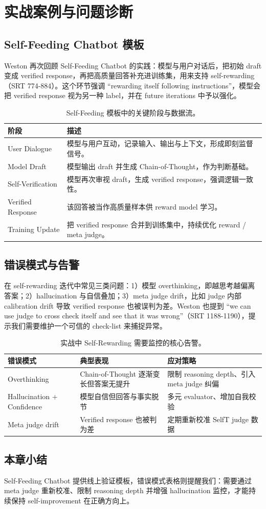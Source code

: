 \section{实战案例与问题诊断}
\subsection{Self-Feeding Chatbot 模板}
Weston 再次回顾 Self-Feeding Chatbot 的实践：模型与用户对话后，把初始 draft 变成 verified response，再把高质量回答补充进训练集，用来支持 self-rewarding（SRT 774-884）。这个环节强调 ``rewarding itself following instructions''，模型会把 verified response 视为另一种 label，并在 future iterations 中予以强化。

\begin{table}[H]
\centering
\begin{tabular}{p{4cm}p{10cm}}
\toprule
阶段 & 描述 \\
\midrule
User Dialogue & 模型与用户互动，记录输入、输出与上下文，形成即刻监督信号。 \\
Model Draft & 模型输出 draft 并生成 Chain-of-Thought，作为判断基础。 \\
Self-Verification & 模型再次审视 draft，生成 verified response，强调逻辑一致性。 \\
Verified Response & 该回答被当作高质量样本供 reward model 学习。 \\
Training Update & 把 verified response 合并到训练集中，持续优化 reward / meta judge。 \\
\bottomrule
\end{tabular}
\caption{Self-Feeding 模板中的关键阶段与数据流。}
\end{table}

\subsection{错误模式与告警}
在 self-rewarding 迭代中常见三类问题：1）模型 overthinking，即越思考越偏离答案；2）hallucination 与自信叠加；3）meta judge drift，比如 judge 内部 calibration drift 导致 verified response 也被误判为差。Weston 也提到 ``we can use judge to cross check itself and see that it was wrong''（SRT 1188-1190），提示我们需要维护一个可信的 check-list 来捕捉异常。

\begin{table}[H]
\centering
\begin{tabular}{p{4cm}p{5cm}p{5cm}}
\toprule
错误模式 & 典型表现 & 应对策略 \\
\midrule
Overthinking & Chain-of-Thought 逐渐变长但答案无提升 & 限制 reasoning depth、引入 meta judge 纠偏 \\
Hallucination + Confidence & 模型自信但回答与事实脱节 & 多元 evaluator、增加自我校验 \\
Meta judge drift & Verified response 也被判为差 & 定期重新校准 SelfT judge 数据 \\
\bottomrule
\end{tabular}
\caption{实战中 Self-Rewarding 需要监控的核心告警。}
\end{table}

\subsection{本章小结}
Self-Feeding Chatbot 提供线上验证模板，错误模式表格则提醒我们：需要通过 meta judge 重新校准、限制 reasoning depth 并增强 hallucination 监控，才能持续保持 self-improvement 在正确方向上。

